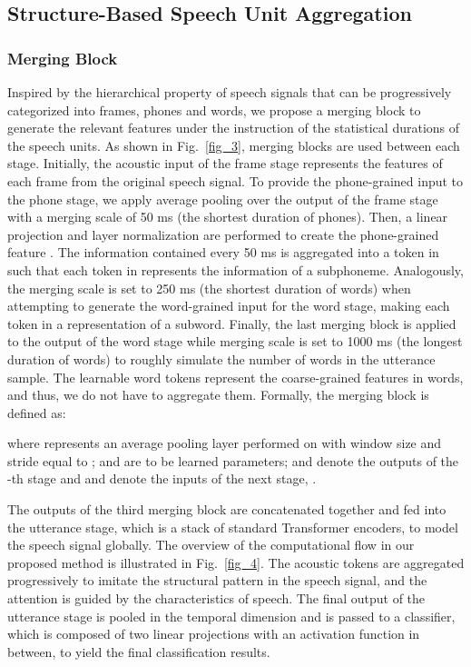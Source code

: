 \documentclass[lettersize,journal]{IEEEtran}
\begin{document}
\subsection{Structure-Based Speech Unit Aggregation}
\label{MB}
\subsubsection{Merging Block}
Inspired by the hierarchical property of speech signals that can be progressively categorized into frames, phones and words, we propose a merging block to generate the relevant features under the instruction of the statistical durations of the speech units. As shown in Fig.~\ref{fig_3},  merging blocks are used between each stage. Initially, the acoustic input of the frame stage  represents the features of each frame from the original speech signal. To provide the phone-grained input to the phone stage, we apply average pooling over the output of the frame stage  with a merging scale  of 50 ms (the shortest duration of phones). Then, a linear projection and layer normalization are performed to create the phone-grained feature . The information contained every 50 ms is aggregated into a token in  such that each token in  represents the information of a subphoneme. Analogously, the merging scale  is set to 250 ms (the shortest duration of words) when attempting to generate the word-grained input  for the word stage, making each token in  a representation of a subword. Finally, the last merging block is applied to the output of the word stage  while merging scale  is set to 1000 ms (the longest duration of words) to roughly simulate the number of words in the utterance sample. 
The learnable word tokens  represent the coarse-grained features in words, and thus, we do not have to aggregate them.
Formally, the merging block is defined as:

where  represents an average pooling layer performed on  with window size and stride equal to ;  and  are to be learned parameters;  and  denote the outputs of the -th stage and  and  denote the inputs of the next stage, .

The outputs of the third merging block are concatenated together and fed into the utterance stage, which is a stack of standard Transformer encoders, to model the speech signal globally. 
The overview of the computational flow in our proposed method is illustrated in Fig.~\ref{fig_4}. The acoustic tokens are aggregated progressively to imitate the structural pattern in the speech signal, and the attention is guided by the characteristics of speech. The final output of the utterance stage is pooled in the temporal dimension and is passed to a classifier, which is composed of two linear projections with an activation function in between, to yield the final classification results.
\end{document}

